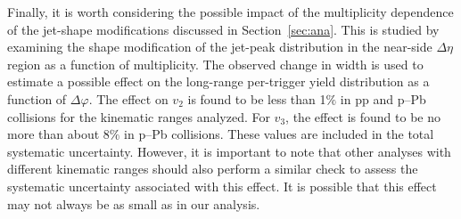 Finally, it is worth considering the possible impact of the multiplicity dependence of the jet-shape modifications discussed in Section~\ref{sec:ana}. This is studied by examining the shape modification of the jet-peak distribution in the near-side $\Delta\eta$ region as a function of  multiplicity. The observed change in width is used to estimate a possible effect on the long-range per-trigger yield distribution as a function of $\Delta\varphi$. The effect on $v_2$ is found to be less than 1$\%$ in pp and p--Pb collisions for the kinematic ranges analyzed. For $v_3$, the effect is found to be no more than about 8$\%$ in p--Pb collisions. These values are included in the total systematic uncertainty. However, it is important to note that other analyses with different kinematic ranges should also perform a similar check to assess the systematic uncertainty associated with this effect. It is possible that this effect may not always be as small as in our analysis.





